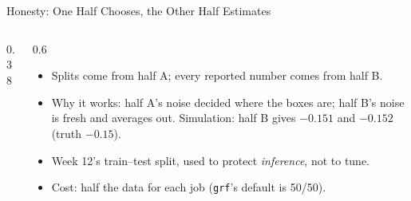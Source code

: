 \documentclass[aspectratio=169,11pt,xcolor=dvipsnames]{beamer}
\newcommand{\core}{\,\raisebox{0.6pt}{\textcolor{corestar}{$\bigstar$}}}
\begin{document}
\begin{frame}{Honesty: One Half Chooses, the Other Half Estimates\core}
\begin{columns}[c]
\begin{column}{0.38\linewidth}
\begin{center}
\end{center}
\end{column}
\begin{column}{0.6\linewidth}
\begin{itemize}\itemsep4pt
  \item Splits come from half A; every reported number comes from half B.
  \item Why it works: half A's noise decided where the boxes are; half B's noise is fresh and
        averages out. Simulation: half B gives $-0.151$ and $-0.152$ (truth $-0.15$).
  \item Week 12's train--test split, used to protect \emph{inference}, not to tune.
  \item Cost: half the data for each job (\texttt{grf}'s default is 50/50).
\end{itemize}
\end{column}
\end{columns}
\end{frame}
\end{document}
